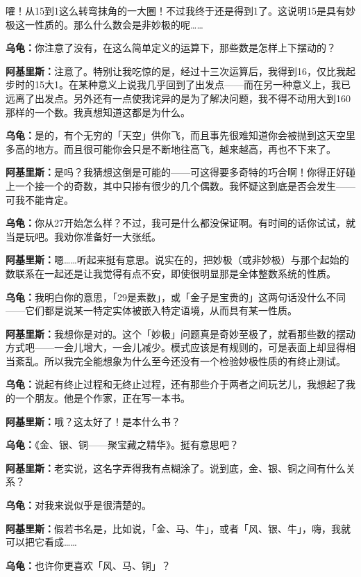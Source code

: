 \documentclass[
  12pt,
  twoside,
  openright,
  oldfontcommands,
]{memoir}
\newcommand{\dialogname}[1]{{\heifamily\bfseries #1}}
\begin{document}
嚯！从15到1这么转弯抹角的一大圈！不过我终于还是得到1了。这说明15是具有妙极这一性质的。那么什么数会是非妙极的呢\ldots\ldots{}

\dialogname{乌龟：}你注意了没有，在这么简单定义的运算下，那些数是怎样上下摆动的？

\dialogname{阿基里斯：}注意了。特别让我吃惊的是，经过十三次运算后，我得到16，仅比我起步时的15大1。在某种意义上说我几乎回到了出发点------而在另一种意义上，我已远离了出发点。另外还有一点使我诧异的是为了解决问题，我不得不动用大到160那样的一个数。我真想知道这都是为什么。

\dialogname{乌龟：}是的，有个无穷的「天空」供你飞，而且事先很难知道你会被抛到这天空里多高的地方。而且很可能你会只是不断地往高飞，越来越高，再也不下来了。

\dialogname{阿基里斯：}是吗？我猜想这倒是可能的------可这得要多奇特的巧合啊！你得正好碰上一个接一个的奇数，其中只掺有很少的几个偶数。我怀疑这到底是否会发生------可我不能肯定。

\dialogname{乌龟：}你从27开始怎么样？不过，我可是什么都没保证啊。有时间的话你试试，就当是玩吧。我劝你准备好一大张纸。

\dialogname{阿基里斯：}嗯\ldots\ldots 听起来挺有意思。说实在的，把妙极（或非妙极）与那个起始的数联系在一起还是让我觉得有点不安，即使很明显那是全体整数系统的性质。

\dialogname{乌龟：}我明白你的意思，「29是素数」，或「金子是宝贵的」这两句话没什么不同------它们都是说某一特定实体被嵌入特定语境，从而具有某一性质。

\dialogname{阿基里斯：}我想你是对的。这个「妙极」问题真是奇妙至极了，就看那些数的摆动方式吧------一会儿增大，一会儿减少。模式应该是有规则的，可是表面上却显得相当紊乱。所以我完全能想象为什么至今还没有一个检验妙极性质的有终止测试。

\dialogname{乌龟：}说起有终止过程和无终止过程，还有那些介于两者之间玩艺儿，我想起了我的一个朋友。他是个作家，正在写一本书。

\dialogname{阿基里斯：}哦？这太好了！是本什么书？

\dialogname{乌龟：}《金、银、铜------聚宝藏之精华》。挺有意思吧？

\dialogname{阿基里斯：}老实说，这名字弄得我有点糊涂了。说到底，金、银、铜之间有什么关系？

\dialogname{乌龟：}对我来说似乎是很清楚的。

\dialogname{阿基里斯：}假若书名是，比如说，「金、马、牛」，或者「风、银、牛」，嗨，我就可以把它看成\ldots\ldots{}

\dialogname{乌龟：}也许你更喜欢「风、马、铜」？
\end{document}
